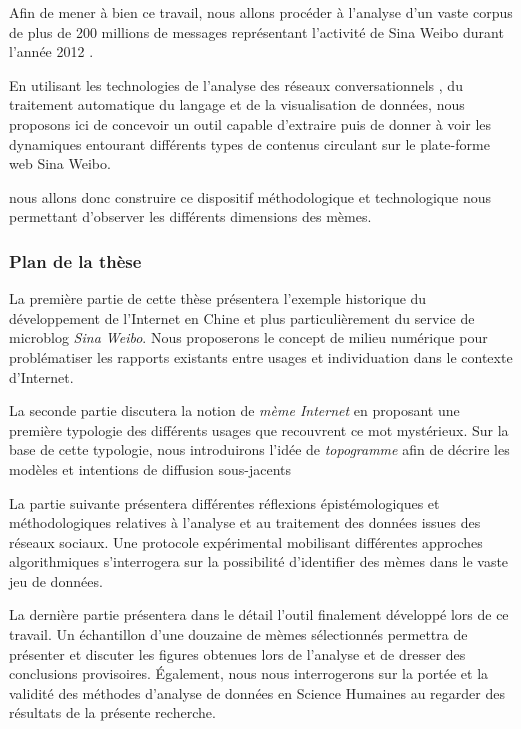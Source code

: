 
Afin de mener à bien ce travail, nous allons procéder à l'analyse d'un vaste corpus de plus de 200 millions de messages représentant l{\textquoteright}activité de Sina Weibo durant l{\textquoteright}année 2012 \cite{Fu2013}. 

En utilisant les technologies de l'analyse des réseaux conversationnels \cite{Weng2013}, du traitement automatique du langage et de la visualisation de données, nous proposons ici de concevoir un outil capable d'extraire puis de donner à voir les dynamiques entourant différents types de contenus circulant sur le plate-forme web Sina Weibo.


nous allons donc construire ce dispositif méthodologique et technologique nous permettant d{\textquoteright}observer les différents dimensions des mèmes.


\subsubsection{Plan de la thèse}


La première partie de cette thèse présentera l'exemple historique du développement de l{\textquoteright}Internet en Chine et plus particulièrement du service de microblog \textit{Sina Weibo}. Nous proposerons le concept de {milieu numérique} pour problématiser les rapports existants entre usages et individuation dans le contexte d'Internet.

La seconde partie discutera la notion de \textit{mème Internet} en proposant une première typologie des différents usages que recouvrent ce mot mystérieux. Sur la base de cette typologie, nous introduirons l'idée de \textit{topogramme} afin de décrire les modèles et intentions de diffusion sous-jacents

La partie suivante présentera différentes réflexions épistémologiques et méthodologiques relatives à l'analyse et au traitement des données issues des réseaux sociaux. Une protocole expérimental mobilisant différentes approches algorithmiques s'interrogera sur la possibilité d'identifier des mèmes dans le vaste jeu de données. 

La dernière partie présentera dans le détail l'outil finalement développé lors de ce travail. Un échantillon d'une douzaine de mèmes sélectionnés permettra de présenter et discuter les figures obtenues lors de l'analyse et de dresser des conclusions provisoires. \'Egalement, nous nous interrogerons sur la portée et la validité des méthodes d'analyse de données en Science Humaines au regarder des résultats de la présente recherche.

